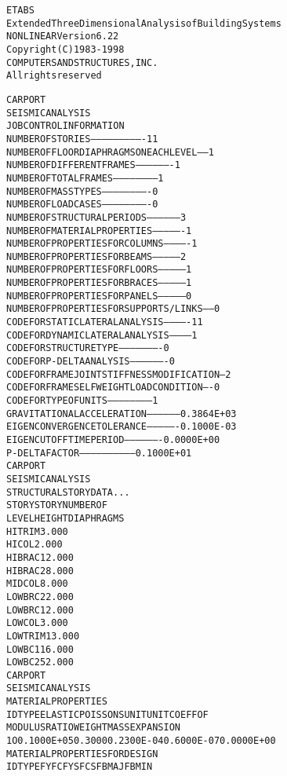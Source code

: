 \documentclass[12pt,notitle,letterpaper]{report}
\renewenvironment{quote}
  {\small\list{}{\rightmargin=0cm \leftmargin=0cm}%
   \item\relax}
  {\endlist}
\begin{document}
\begin{quote}
\begin{alltt}
                                E T A B S
            Extended Three Dimensional Analysis of Building Systems
                           NONLINEAR Version 6.22
                           Copyright (C) 1983-1998
                        COMPUTERS AND STRUCTURES, INC.
                              All rights reserved

CARPORT
SEISMIC ANALYSIS
J O B   C O N T R O L   I N F O R M A T I O N
NUMBER OF STORIES----------------------------  11
NUMBER OF FLOOR DIAPHRAGMS ON EACH LEVEL-----   1
NUMBER OF DIFFERENT FRAMES-------------------   1
NUMBER OF TOTAL FRAMES-----------------------   1
NUMBER OF MASS TYPES-------------------------   0
NUMBER OF LOAD CASES-------------------------   0
NUMBER OF STRUCTURAL PERIODS-----------------   3
NUMBER OF MATERIAL PROPERTIES----------------   1
NUMBER OF PROPERTIES FOR COLUMNS-------------   1
NUMBER OF PROPERTIES FOR BEAMS---------------   2
NUMBER OF PROPERTIES FOR FLOORS--------------   1
NUMBER OF PROPERTIES FOR BRACES--------------   1
NUMBER OF PROPERTIES FOR PANELS--------------   0
NUMBER OF PROPERTIES FOR SUPPORTS/LINKS------   0
CODE FOR STATIC LATERAL ANALYSIS-------------  11
CODE FOR DYNAMIC LATERAL ANALYSIS------------   1
CODE FOR STRUCTURE TYPE----------------------   0
CODE FOR P-DELTA ANALYSIS -------------------   0
CODE FOR FRAME JOINT STIFFNESS MODIFICATION--   2
CODE FOR FRAME SELF WEIGHT LOAD CONDITION----   0
CODE FOR TYPE OF UNITS-----------------------   1
GRAVITATIONAL ACCELERATION-----------------   0.3864E+03
EIGEN CONVERGENCE TOLERANCE----------------   0.1000E-03
EIGEN CUTOFF TIME PERIOD-------------------   0.0000E+00
P-DELTA FACTOR-----------------------------   0.1000E+01
CARPORT
SEISMIC ANALYSIS
STRUCTURAL STORY DATA . . .
STORY         STORY  NUMBER OF
LEVEL        HEIGHT DIAPHRAGMS
HITRIM         3.00          0
HICOL          2.00          0
HIBRAC1        2.00          0
HIBRAC2        8.00          0
MIDCOL         8.00          0
LOWBRC2        2.00          0
LOWBRC1        2.00          0
LOWCOL         3.00          0
LOWTRIM       13.00          0
LOWBC1        16.00          0
LOWBC2        52.00          0
CARPORT
SEISMIC ANALYSIS
MATERIAL PROPERTIES
ID TYPE     ELASTIC    POISSONS        UNIT        UNIT    COEFF OF
            MODULUS       RATIO      WEIGHT        MASS   EXPANSION
   1    O  0.1000E+05      0.3000  0.2300E-04  0.6000E-07  0.0000E+00
MATERIAL PROPERTIES FOR DESIGN
ID TYPE         FY         FC        FYS        FCS      FBMAJ      FBMIN


\end{alltt}
\end{quote}
\end{document}
